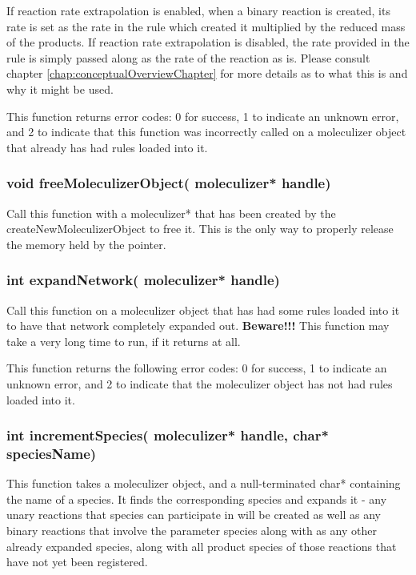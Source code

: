 If reaction rate extrapolation is enabled, when a binary reaction is
created, its rate is set as the rate in the rule which created it multiplied
by the reduced mass of the products.  If reaction rate extrapolation
is disabled, the rate provided in the rule is simply passed along as
the rate of the reaction as is.  Please consult chapter
\ref{chap:conceptualOverviewChapter} for more details as to what this
is and why it might be used.

This function returns error codes: 0 for success, 1 to indicate an
unknown error, and 2 to indicate that this function was incorrectly
called on a moleculizer object that already has had rules loaded into
it.  

\subsubsection{void freeMoleculizerObject( moleculizer* handle)}
Call this function with a moleculizer* that has been created by the
createNewMoleculizerObject to free it.  This is the only way to
properly release the memory held by the pointer.

\subsubsection{int expandNetwork( moleculizer* handle)}
Call this function on a moleculizer object that has had some rules
loaded into it to have that network completely expanded out.
\textbf{Beware!!!}  This function may take a very long time to run, if
  it returns at all.  

This function returns the following error codes: 0 for success, 1 to
indicate an unknown error, and 2 to indicate that the moleculizer
object has not had rules loaded into it.  

\subsubsection{int incrementSpecies( moleculizer* handle, char*
  speciesName)}

This function takes a moleculizer object, and a null-terminated char*
containing the name of a species.  It finds the corresponding species
and expands it - any unary reactions that species can participate in
will be created as well as any binary reactions that involve the
parameter species along with as any other already expanded species, along
with all product species of those reactions that have not yet been
registered.  

